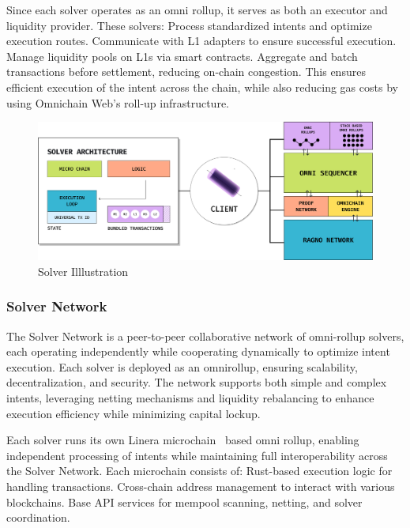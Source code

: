Since each solver operates as an omni rollup, it serves as both an executor and liquidity provider. These solvers: Process standardized intents and optimize execution routes. Communicate with L1 adapters to ensure successful execution. Manage liquidity pools on L1s via smart contracts. Aggregate and batch transactions before settlement, reducing on-chain congestion.
This ensures efficient execution of the intent across the chain, while also reducing gas costs by using Omnichain Web’s roll-up infrastructure.
\begin{figure}[h]
    \centering
    \includegraphics[width=0.9\linewidth]{figure/solver.png}
    \caption{Solver Illlustration}
    \label{fig:solver}
\end{figure}

\subsubsection{Solver Network}
The Solver Network is a peer-to-peer collaborative network of omni-rollup solvers, each operating independently while cooperating dynamically to optimize intent execution. Each solver is deployed as an omnirollup, ensuring scalability, decentralization, and security. The network supports both simple and complex intents, leveraging netting mechanisms and liquidity rebalancing to enhance execution efficiency while minimizing capital lockup.

Each solver runs its own Linera microchain~\cite{linera} based omni rollup, enabling independent processing of intents while maintaining full interoperability across the Solver Network. Each microchain consists of: Rust-based execution logic for handling transactions. Cross-chain address management to interact with various blockchains. Base API services for mempool scanning, netting, and solver coordination.

